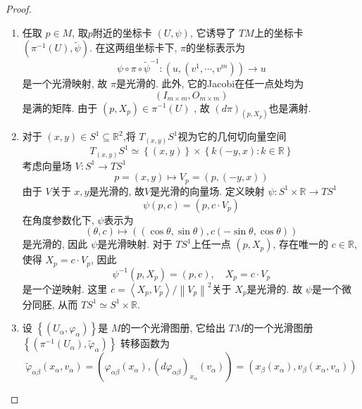 \documentclass[../main.tex]{subfiles}
\begin{document}
\begin{proof}
    \begin{enumerate}
        \item [a).] 任取 \(  p \in M  \), 取\(  p  \)附近的坐标卡 \(  \left( U, \psi  \right)   \), 它诱导了 \(  TM  \)上的坐标卡 \(  \left(  \pi ^{-1} \left( U \right),  \tilde{\psi}   \right)   \). 在这两组坐标卡下, \(   \pi  \)的坐标表示为 \[
         \psi \circ  \pi  \circ \tilde{\psi} ^{-1} : \left( u, \left( v^{1},\cdots ,v^{m} \right)  \right)\to u 
        \] 是一个光滑映射, 故 \(   \pi  \)是光滑的. 此外,    它的Jacobi在任一点处均为 \[
        \left( I_{m\times m},O_{m\times m} \right) 
        \]是满的矩阵. 由于 \(  \left( p,X_{p} \right)\in  \pi ^{-1} \left( U \right)    \) , 故 \(  \left( d  \pi \right)_{\left( p,X_{p} \right) }   \)也是满射. 
      \item [b).] 对于 \(  \left( x,y \right)\in S^{1}\subseteq \mathbb{R} ^{2}   \),将  \(  T_{\left( x,y \right) }S^{1}  \)视为它的几何切向量空间 \[
     T_{\left( x,y \right) }S^{1}\simeq \left\{ \left( x,y \right)  \right\}\times \left\{ k \left( -y,x \right) : k \in \mathbb{R} \right\}
      \] 考虑向量场 \(  V:S^{1}\to  TS^{1} \) \[
      p= \left( x,y \right)\mapsto V_{p}= \left( p,\left( -y,x \right)  \right)  
      \]  由于 \(  V  \)关于 \(  x,y  \)是光滑的, 故\(  V  \)是光滑的向量场.   定义映射 \(   \psi :S^{1}\times \mathbb{R} \to TS^{1}  \) \[
       \psi \left( p,c \right)= \left( p, c\cdot V_{p} \right)  
      \] 在角度参数化下,  \(   \psi   \)表示为 \[
      \left(  \theta ,c \right)\mapsto  \left( \left( \cos  \theta , \sin  \theta  \right), c \left( -\sin  \theta , \cos  \theta  \right)   \right)  
      \] 是光滑的, 因此 \(   \psi   \)是光滑映射. 对于 \(  TS^{1}  \)上任一点 \(  \left( p,X_{p} \right)   \), 存在唯一的 \(  c\in \mathbb{R}   \), 使得 \(  X_{p}= c\cdot V_{p}  \), 因此 \[
       \psi ^{-1} \left( p,X_{p} \right)= \left( p,c \right),\quad X_{p}= c\cdot V_{p}  
      \]    是一个逆映射. 这里 \(  c= \left<X_{p},V_{p} \right>/ \left\| V_{p} \right\|^{2}  \)关于 \(  X_{p}  \)是光滑的. 故 \(   \psi   \)是一个微分同胚,  从而 \(  TS^{1}\simeq S^{1}\times \mathbb{R}   \).    
      \item [c).] 设 \(  \left\{ \left( U_{\alpha }, \varphi _{\alpha } \right)  \right\}  \)是 \(  M  \)的一个光滑图册, 它给出 \(  TM  \)的一个光滑图册 \(  \left\{ \left(  \pi ^{-1} \left( U_{\alpha } \right),  \tilde{\varphi} _{\alpha }  \right)  \right\}  \)  转移函数为 \[
       \tilde{\varphi} _{\alpha \beta }\left( x_{\alpha },v_{\alpha } \right)= \left(  \varphi _{\alpha \beta }\left( x_{\alpha } \right), \left( d  \varphi _{\alpha \beta } \right)_{x_{\alpha }}\left( v_{\alpha } \right)    \right)  = \left( x_{\beta }\left( x_{\alpha } \right) , v_{\beta }  \left( x_{\alpha },v_{\alpha } \right) \right) 
\]
\end{enumerate}
\end{proof}
\end{document}
